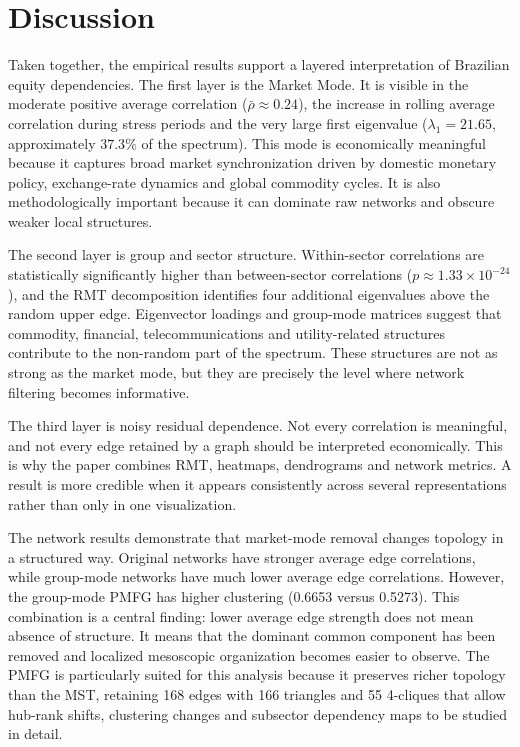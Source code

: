 \section{Discussion}
\label{sec:discussion}

Taken together, the empirical results support a layered interpretation of Brazilian equity dependencies. The first layer is the Market Mode. It is visible in the moderate positive average correlation ($\bar{\rho} \approx 0.24$), the increase in rolling average correlation during stress periods and the very large first eigenvalue ($\lambda_1 = 21.65$, approximately $37.3\%$ of the spectrum). This mode is economically meaningful because it captures broad market synchronization driven by domestic monetary policy, exchange-rate dynamics and global commodity cycles. It is also methodologically important because it can dominate raw networks and obscure weaker local structures.

The second layer is group and sector structure. Within-sector correlations are statistically significantly higher than between-sector correlations ($p \approx 1.33 \times 10^{-24}$), and the RMT decomposition identifies four additional eigenvalues above the random upper edge. Eigenvector loadings and group-mode matrices suggest that commodity, financial, telecommunications and utility-related structures contribute to the non-random part of the spectrum. These structures are not as strong as the market mode, but they are precisely the level where network filtering becomes informative.

The third layer is noisy residual dependence. Not every correlation is meaningful, and not every edge retained by a graph should be interpreted economically. This is why the paper combines RMT, heatmaps, dendrograms and network metrics. A result is more credible when it appears consistently across several representations rather than only in one visualization.

The network results demonstrate that market-mode removal changes topology in a structured way. Original networks have stronger average edge correlations, while group-mode networks have much lower average edge correlations. However, the group-mode PMFG has higher clustering (0.6653 versus 0.5273). This combination is a central finding: lower average edge strength does not mean absence of structure. It means that the dominant common component has been removed and localized mesoscopic organization becomes easier to observe. The PMFG is particularly suited for this analysis because it preserves richer topology than the MST, retaining 168 edges with 166 triangles and 55 4-cliques that allow hub-rank shifts, clustering changes and subsector dependency maps to be studied in detail.

